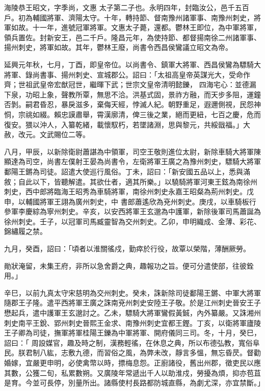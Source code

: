 
\begin{pinyinscope}

 海陵恭王昭文，字季尚，文惠
 太子第二子也。永明四年，封臨汝公，邑千五百戶。初為輔國將軍、濟陽太守。十年，轉持節、督南豫州諸軍事、南豫州刺史，將軍如故。十一年，進號冠軍將軍。文惠太子薨，還都。鬱林王即位，為中軍將軍，領兵置佐。封新安王，邑二千戶。隆昌元年，為使持節、都督揚南徐二州諸軍事、揚州刺史，將軍如故。其年，鬱林王廢，尚書令西昌侯鸞議立昭文為帝。



 延興元年秋，七月，丁酉，即皇帝位。以尚書令、鎮軍大將軍、西昌侯鸞為驃騎大將軍、錄尚書事、揚州刺史、宣城郡公。詔曰：「太祖高皇帝英謀光大，受命作齊；世祖武皇帝宏猷冠世，繼暉下武；世宗文皇帝清明懿鑠，
 四海宅心：並德漏下泉，功昭上象，聲教所覃，無思不洽。洪基式固，景祚方融，而天步多阻，運鐘否剝。嗣君昏忍，暴戾滋多，棄侮天經，悖滅人紀。朝野重足，遐邇側視，民怨神恫，宗祧如綴。賴忠謨肅舉，霄漢廓清，俾三後之業，絕而更紐，七百之慶，危而復安。猥以沖人，入纂乾緒，載懷馭朽，若墜諸淵，思與黎元，共綏戩福。」大赦，改元。文武賜位二等。



 八月，甲辰，以新除衛尉蕭諶為中領軍，司空王敬則進位太尉，新除車騎大將軍陳顯達為司空，尚書左僕射王晏為尚書令，左衛將軍王廣之為豫州刺史，驃騎大將軍鄱陽王鏘為司徒。詔遣大使巡行風俗。丁未，詔曰：「新安國五品以上，悉與滿敘；自此以下，皆聽解遣。其欲仕者，適其所樂。」以驍騎將軍河東王鉉為南徐州刺史，西中郎將臨海王昭秀為車騎將軍，南徐州刺史永嘉王昭粲為荊州刺史。戊申，以輔國將軍王詡為廣州刺史，中
 書郎蕭遙欣為兗州刺史。庚戌，以車騎板行參軍李慶綜為寧州刺史。辛亥，以安西將軍王玄邈為中護軍，新除後軍司馬蕭誕為徐州刺史。壬子，以冠軍司馬臧靈智為交州刺史。乙卯，申明織成、金薄、彩花、錦繡履之禁。



 九月，癸酉，詔曰：「頃者以淮關徭戍，勤瘁於行役，故覃以榮階，薄酬厥勞。



 勛狀淹留，未集王府，非所以急舍爵之典，趣報功之旨。便可分遣使部，往彼銓用。」



 辛巳，以前九真太守宋慈明為交州刺史。癸未，誅新除司徒鄱陽王鏘、中軍大將軍隨郡王子隆。遣平西將軍王廣之誅南兗州刺史安陸王子敬。於是江州刺史晉安王子懋起兵，遣中護軍王玄邈討之。乙未，驃騎大將軍鸞假黃鋮，內外纂嚴。又誅湘州刺史南平王銳、郢州刺史晉熙王金求、南豫州刺史宜都王鏗。丁亥，以衛將軍廬陵王子卿為司徒，撫軍將軍桂陽王鑠為中軍將軍、開府儀同三司。冬，十月，癸巳，詔曰：「
 周設媒官，趣及時之制，漢務輕徭，在休息之典，所以布德弘教，寬俗阜民。朕君制八紘，志敷九德，而習俗之風，為弊未改，靜言多慍，無忘昏昃。督勸婚嫁，宜嚴更申明，必使禽幣以時，摽梅息怨。正廚諸役，舊出州郡，徵吏民以應其數，公獲二旬，私累數朔。又廣陵年常遞出千人以助淮戍，勞擾為煩，抑亦苞苴是育。今並可長停，別量所出。諸縣使村長路都防城直縣，為劇尤深，亦宜禁斷。」




\end{pinyinscope}
